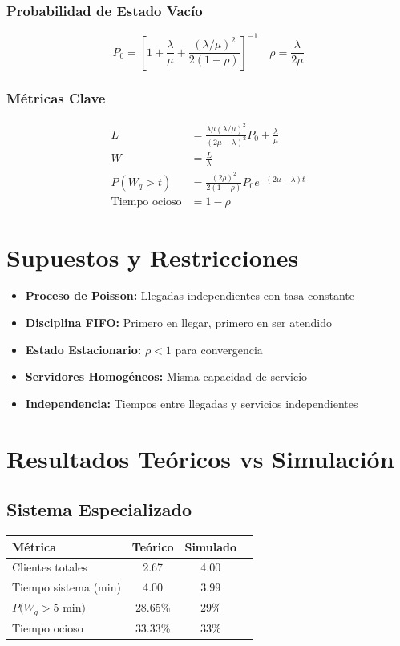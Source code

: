 \documentclass[letterpaper, 12pt]{report}
\begin{document}
\subsubsection{Probabilidad de Estado Vacío}
\[
P_0 = \left[1 + \frac{\lambda}{\mu} + \frac{(\lambda/\mu)^2}{2(1 - \rho)}\right]^{-1} \quad \rho = \frac{\lambda}{2\mu}
\]

\subsubsection{Métricas Clave}
\begin{align*}
L &= \frac{\lambda\mu(\lambda/\mu)^2}{(2\mu - \lambda)^2}P_0 + \frac{\lambda}{\mu} \\
W &= \frac{L}{\lambda} \\
P(W_q > t) &= \frac{(2\rho)^2}{2(1 - \rho)}P_0 e^{-(2\mu - \lambda)t} \\
\text{Tiempo ocioso} &= 1 - \rho
\end{align*}

\section{Supuestos y Restricciones}
\begin{itemize}
\item \textbf{Proceso de Poisson:} Llegadas independientes con tasa constante
\item \textbf{Disciplina FIFO:} Primero en llegar, primero en ser atendido
\item \textbf{Estado Estacionario:} $\rho < 1$ para convergencia
\item \textbf{Servidores Homogéneos:} Misma capacidad de servicio
\item \textbf{Independencia:} Tiempos entre llegadas y servicios independientes
\end{itemize}

\section{Resultados Teóricos vs Simulación}
\subsection{Sistema Especializado}
\begin{table}[h]
\centering
\begin{tabular}{lccc}
\toprule
Métrica & Teórico & Simulado  \\
\midrule
Clientes totales & 2.67 & 4.00  \\
Tiempo sistema (min) & 4.00 & 3.99  \\
$P(W_q >5$ min$)$ & 28.65\% & 29\%  \\
Tiempo ocioso & 33.33\% & 33\%  \\
\bottomrule
\end{tabular}
\end{table}
\end{document}
